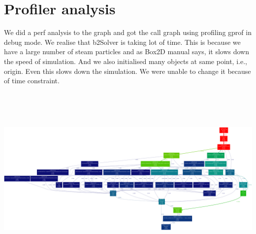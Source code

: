 \documentclass[11pt]{article}
\begin{document}
\section{Profiler analysis}
We did a perf analysis to the graph and got the call graph using profiling gprof in debug mode. We realise that b2Solver is taking lot of time. This is because we have a large number of steam particles and as Box2D manual\cite{box2d} says, it slows down the speed of simulation. And we also initialised many objects at same point, i.e., origin. Even this slows down the simulation. We were unable to change it because of time constraint.\\ 
\includegraphics[width=15cm,height=10cm]{output.png} 


\end{document}
